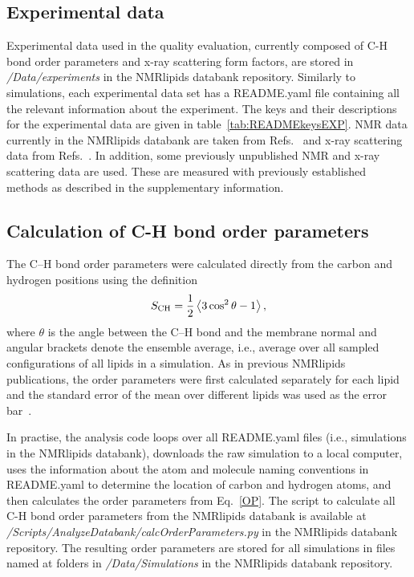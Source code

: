 \documentclass[fleqn,10pt]{wlscirep}
\begin{document}
\subsection{Experimental data}
Experimental data used in the quality evaluation, currently composed of C-H bond order parameters and x-ray scattering form factors, are stored in {\it /Data/experiments} in the NMRlipids databank repository. Similarly to simulations, each experimental data set has a README.yaml file containing all the relevant information about the experiment. The keys and their descriptions for the experimental data are given in table~\ref{tab:READMEkeysEXP}. NMR data currently in the NMRlipids databank are taken from Refs.~ and x-ray scattering data from Refs.~. In addition, some previously unpublished NMR and x-ray scattering data are used. These are measured with previously established methods as described in the supplementary information. 

\subsection{Calculation of C-H bond order parameters}
The C--H bond order parameters were calculated directly from the carbon and hydrogen positions using the definition
\begin{equation}\label{OP}
S_{\rm CH}=\frac{1}{2}\left\langle 3\cos^2\theta -1 \right\rangle,
\end{equation}
where $\theta$ is the angle between the C--H bond and the membrane normal
and angular brackets denote the ensemble average, i.e., average over all sampled configurations of all lipids in a simulation. As in previous NMRlipids publications, the order parameters were first calculated separately for each lipid and the standard error of the mean over different lipids was used as the error bar~\cite{botan15}. 

In practise, the analysis code loops over all README.yaml files (i.e., simulations in the NMRlipids databank), downloads the raw simulation to a local computer, uses the information about the atom and molecule naming conventions in README.yaml to determine the location of carbon and hydrogen atoms, and then calculates the order parameters from Eq.~\ref{OP}. The script to calculate all C-H bond order parameters from the NMRlipids databank is available at {\it /Scripts/AnalyzeDatabank/calcOrderParameters.py} in the NMRlipids databank repository. The resulting order parameters are stored for all simulations in files named  at folders in {\it /Data/Simulations} in the NMRlipids databank repository.
\end{document}
